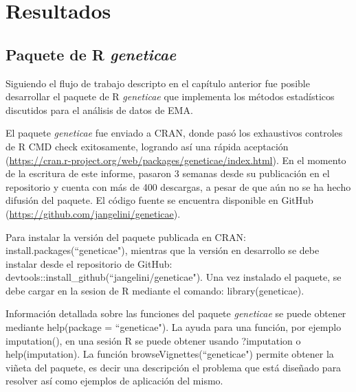 

\chapter{Resultados}

\section{Paquete de R \emph{geneticae}}

Siguiendo el flujo de trabajo descripto en el capítulo anterior fue posible desarrollar el paquete de R \emph{geneticae} que implementa los métodos estadísticos discutidos para el análisis de datos de EMA.

El paquete \emph{geneticae} fue enviado a CRAN, donde pasó los exhaustivos controles de R CMD check exitosamente, logrando así una rápida aceptación  (\url{https://cran.r-project.org/web/packages/geneticae/index.html}). En el momento de la escritura de este informe, pasaron 3 semanas desde su publicación en el repositorio y cuenta con más de 400 descargas, a pesar de que aún no se ha hecho difusión del paquete. El código fuente se encuentra disponible en GitHub (\url{https://github.com/jangelini/geneticae}).

Para instalar la versión del paquete publicada en CRAN:  \textcolor{fandango}{install.packages(``geneticae")}, mientras que la versión en desarrollo se debe instalar desde el repositorio de GitHub:  \textcolor{fandango}{devtools::install\_github(``jangelini/geneticae")}. Una vez instalado el paquete, se debe cargar en la sesion de R mediante el comando: \textcolor{fandango}{library(geneticae)}. 

Información detallada sobre las funciones del paquete \emph{geneticae} se puede obtener mediante \textcolor{fandango}{help(package = ``geneticae")}. La ayuda para una función, por ejemplo \textcolor{fandango}{imputation()}, en una sesión R se puede obtener usando \textcolor{fandango}{?imputation} o \textcolor{fandango}{help(imputation)}. La función \textcolor{fandango}{browseVignettes(``geneticae")} permite obtener la viñeta del paquete, es decir una descripción el problema que está diseñado para resolver así como ejemplos de aplicación del mismo. 

